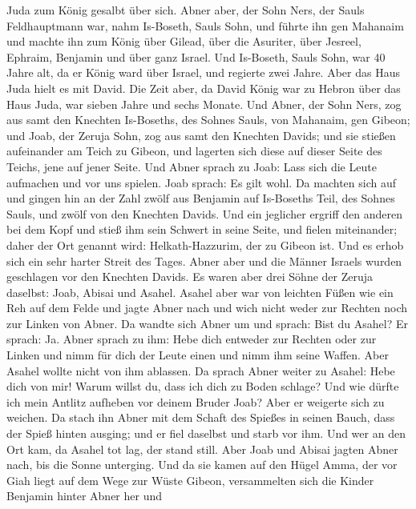 Juda zum König gesalbt über sich.  Abner aber, der Sohn
Ners, der Sauls Feldhauptmann war, nahm Is-Boseth, Sauls Sohn, und
führte ihn gen Mahanaim  und machte ihn zum König über
Gilead, über die Asuriter, über Jesreel, Ephraim, Benjamin und über ganz
Israel.  Und Is-Boseth, Sauls Sohn, war 40 Jahre alt, da er
König ward über Israel, und regierte zwei Jahre. Aber das Haus Juda
hielt es mit David.  Die Zeit aber, da David König war zu
Hebron über das Haus Juda, war sieben Jahre und sechs Monate.
 Und Abner, der Sohn Ners, zog aus samt den Knechten
Is-Boseths, des Sohnes Sauls, von Mahanaim, gen Gibeon; 
und Joab, der Zeruja Sohn, zog aus samt den Knechten Davids; und sie
stießen aufeinander am Teich zu Gibeon, und lagerten sich diese auf
dieser Seite des Teichs, jene auf jener Seite.  Und Abner
sprach zu Joab: Lass sich die Leute aufmachen und vor uns spielen. Joab
sprach: Es gilt wohl.  Da machten sich auf und gingen hin
an der Zahl zwölf aus Benjamin auf Is-Boseths Teil, des Sohnes Sauls,
und zwölf von den Knechten Davids.  Und ein jeglicher
ergriff den anderen bei dem Kopf und stieß ihm sein Schwert in seine
Seite, und fielen miteinander; daher der Ort genannt wird:
Helkath-Hazzurim, der zu Gibeon ist.  Und es erhob sich ein
sehr harter Streit des Tages. Abner aber und die Männer Israels wurden
geschlagen vor den Knechten Davids.  Es waren aber drei
Söhne der Zeruja daselbst: Joab, Abisai und Asahel. Asahel aber war von
leichten Füßen wie ein Reh auf dem Felde  und jagte Abner
nach und wich nicht weder zur Rechten noch zur Linken von Abner.
 Da wandte sich Abner um und sprach: Bist du Asahel? Er
sprach: Ja.  Abner sprach zu ihm: Hebe dich entweder zur
Rechten oder zur Linken und nimm für dich der Leute einen und nimm ihm
seine Waffen. Aber Asahel wollte nicht von ihm ablassen. 
Da sprach Abner weiter zu Asahel: Hebe dich von mir! Warum willst du,
dass ich dich zu Boden schlage? Und wie dürfte ich mein Antlitz aufheben
vor deinem Bruder Joab?  Aber er weigerte sich zu weichen.
Da stach ihn Abner mit dem Schaft des Spießes in seinen Bauch, dass der
Spieß hinten ausging; und er fiel daselbst und starb vor ihm. Und wer an
den Ort kam, da Asahel tot lag, der stand still.  Aber Joab
und Abisai jagten Abner nach, bis die Sonne unterging. Und da sie kamen
auf den Hügel Amma, der vor Giah liegt auf dem Wege zur Wüste Gibeon,
 versammelten sich die Kinder Benjamin hinter Abner her und

